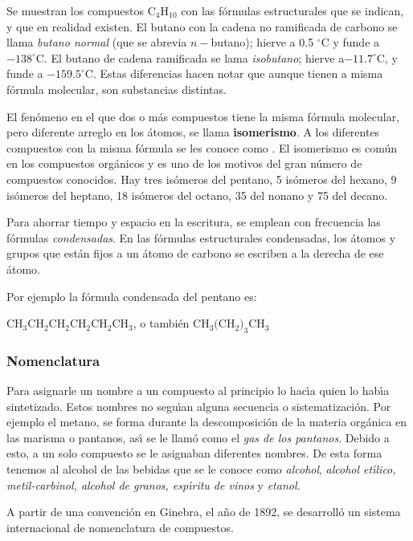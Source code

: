 Se muestran los compuestos  C$_4$H$_{10}$ con las f\'ormulas estructurales que se
indican, y que en realidad existen. El butano con la cadena no ramificada de carbono se
llama
\textit{butano normal} (que se abrevia $n-$butano); hierve a 0.5 $^\circ$C y funde a
$-138^\circ$C. El  butano de cadena ramificada se lama \textit{isobutano}; hierve a$-
11.7^\circ$C, y funde a $-159.5^\circ$C. Estas diferencias hacen notar que aunque
tienen a misma f\'ormula molecular, son substancias distintas.

El fen\'omeno en el que dos o m\'as compuestos tiene la misma f\'ormula molecular, pero
diferente arreglo en los \'atomos, se llama \textbf{isomerismo}. A los diferentes
compuestos con la misma f\'ormula se les conoce como \textbf{}. 
 El isomerismo es com\'un en los compuestos org\'anicos y es uno de
los motivos del gran n\'umero de compuestos conocidos. Hay tres is\'omeros del pentano,
5 is\'omeros del hexano, 9 is\'omeros del heptano, 18 is\'omeros del octano, 35 del
nonano y 75 del decano.

Para ahorrar tiempo y espacio en la escritura, se emplean con frecuencia las f\'ormulas
\textit{condensadas}.  En las f\'ormulas estructurales condensadas, los
\'atomos y grupos que est\'an fijos a un \'atomo de carbono se escriben a la derecha de
ese \'atomo.

  Por ejemplo la f\'ormula condensada del pentano es:

CH$_3$CH$_2$CH$_2$CH$_2$CH$_2$CH$_3$, o tambi\'en CH$_3($CH$_2)_3$CH$_3$

\subsubsection{Nomenclatura}

Para asignarle un nombre a un compuesto al principio lo hac\'{\i}a quien lo hab\'{\i}a
sintetizado. Estos nombres no segu\'{\i}an alguna secuencia o sistematizaci\'on. Por
ejemplo el metano, se forma durante la descomposici\'on de la materia org\'anica en las
marisma o pantanos, as\'{\i} se le llam\'o como el \textit{gas de los pantanos}. Debido
a esto, a un solo compuesto se le asignaban diferentes nombres. De esta forma tenemos al
alcohol de las bebidas que se le conoce como \textit{alcohol}, \textit{alcohol
et\'{\i}lico, metil-carbinol, alcohol de granos, esp\'{\i}ritu de vinos} y
\textit{etanol.}

A partir de una convenci\'on en Ginebra, el a\~no de 1892, se desarroll\'o un sistema internacional de nomenclatura de compuestos.

